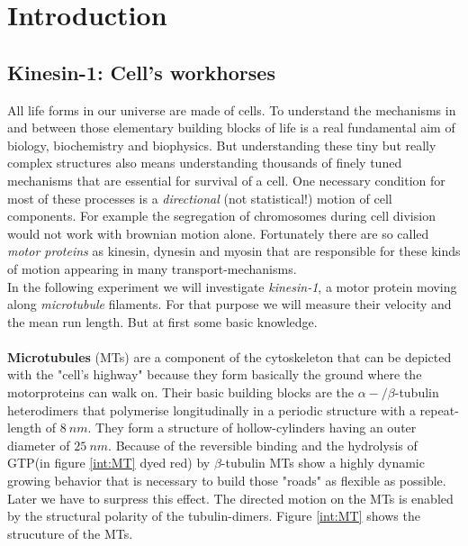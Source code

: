 \section{Introduction}
	\subsection{Kinesin-1: Cell's workhorses}
		All life forms in our universe are made of cells. To understand the mechanisms in and between those elementary building blocks of life is a real fundamental aim of biology, biochemistry and biophysics. But understanding these tiny but really complex structures also means understanding thousands of finely tuned mechanisms that are essential for survival of a cell. One necessary condition for most of these processes is a \textit{directional} (not statistical!) motion of cell components. For example the segregation of chromosomes during cell division would not work with brownian motion alone. Fortunately there are so called \textit{motor proteins} as kinesin, dynesin and myosin that are responsible for these kinds of motion appearing in many transport-mechanisms.\\
		In the following experiment we will investigate \textit{kinesin-1}, a motor protein moving along \textit{microtubule} filaments. For that purpose we will measure their velocity and the mean run length. But at first some basic knowledge.\\
		\ \\
		\textbf{Microtubules} (MTs) are a component of the cytoskeleton that can be depicted with the "cell's highway" because they form basically the ground where the motorproteins can walk on. Their basic building blocks are the $\alpha-/\beta$-tubulin heterodimers that polymerise longitudinally in a periodic structure with a repeat-length of $8\ \unit{nm}$. They form a structure of hollow-cylinders having an outer diameter of $25\ \unit{nm}$. Because of the reversible binding and the hydrolysis of GTP(in figure \ref{int:MT} dyed red) by $\beta$-tubulin MTs show a highly dynamic growing behavior that is necessary to build those "roads" as flexible as possible. Later we have to surpress this effect. The directed motion on the MTs is enabled by the structural polarity of the tubulin-dimers. Figure \ref{int:MT} shows the strucuture of the MTs.\cite{PA}\\
